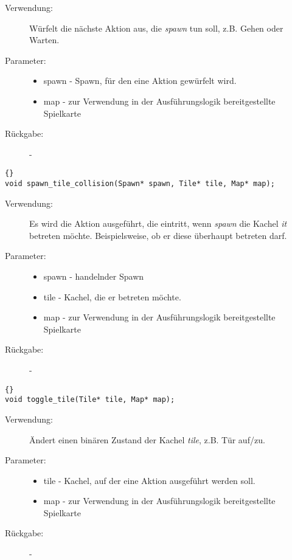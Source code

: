 \documentclass[11pt,a4paper,notitlepage]{report}
\begin{document}
	\begin{description}
		\item[Verwendung:] Würfelt die nächste Aktion aus, die \textit{spawn} tun soll, z.B. Gehen oder Warten.
		\item[Parameter:] \hfill
		\begin{itemize}
			\item spawn - Spawn, für den eine Aktion gewürfelt wird.
			\item map - zur Verwendung in der Ausführungslogik bereitgestellte Spielkarte
		\end{itemize}
		\item[Rückgabe:] -
	\end{description}
	
	\begin{lstlisting}[caption=spawn\_tile\_collision]{}
void spawn_tile_collision(Spawn* spawn, Tile* tile, Map* map);
		\end{lstlisting}
		
	\begin{description}
		\item[Verwendung:] Es wird die Aktion ausgeführt, die eintritt, wenn \textit{spawn} die Kachel \textit{it} betreten möchte. Beispielsweise, ob er diese überhaupt betreten darf.
		\item[Parameter:] \hfill
		\begin{itemize}
			\item spawn - handelnder Spawn
			\item tile - Kachel, die er betreten möchte.
			\item map - zur Verwendung in der Ausführungslogik bereitgestellte Spielkarte
		\end{itemize}
		\item[Rückgabe:] -
	\end{description}
	
		\begin{lstlisting}[caption=toggle\_tile]{}
void toggle_tile(Tile* tile, Map* map);
		\end{lstlisting}
		
	\begin{description}
		\item[Verwendung:] Ändert einen binären Zustand der Kachel \textit{tile}, z.B. Tür auf/zu.
		\item[Parameter:] \hfill
		\begin{itemize}
			\item tile - Kachel, auf der eine Aktion ausgeführt werden soll.
			\item map - zur Verwendung in der Ausführungslogik bereitgestellte Spielkarte
		\end{itemize}
		\item[Rückgabe:] -
	\end{description}
\end{document}
